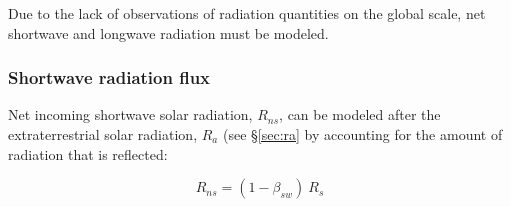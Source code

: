 \noindent Due to the lack of observations of radiation quantities on the global scale, net shortwave and longwave radiation must be modeled.

\subsubsection{Shortwave radiation flux}
\label{sec:rs}
Net incoming shortwave solar radiation, $R_{ns}$, can be modeled after the extraterrestrial solar radiation, $R_a$ (see \S \ref{sec:ra} by accounting for the amount of radiation that is reflected:

\begin{equation}
\label{eq:rns}
	R_{ns} = \left(1 - \beta_{sw}\right)\: R_s
\end{equation}

